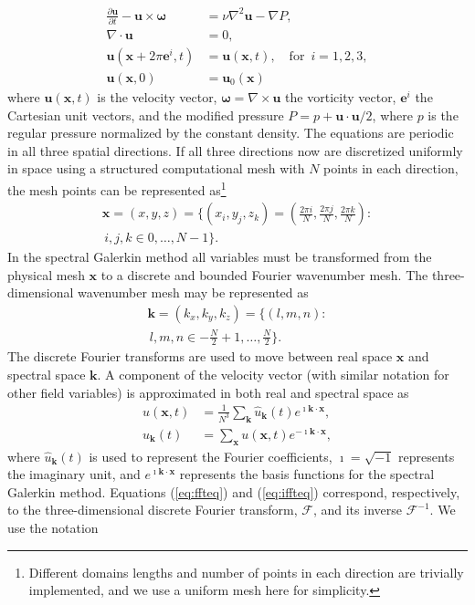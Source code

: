 \documentclass[final,3p,times,twocolumn]{elsarticle}
\newcounter{bla}
\begin{document}
\begin{align}
 \frac{\partial \bm{u}}{\partial t} - \bm{u} \times \bm{\omega}   &= \nu \nabla^2 \bm{u} - \nabla{P}, \label{eq:NS} \\
 \nabla \cdot \bm{u} &= 0, \\
 \bm{u}(\bm{x}+2\pi \bm{e}^i, t) &= \bm{u}(\bm{x}, t), \quad \text{for }\, i=1,2,3,\\
 \bm{u}(\bm{x}, 0) &= \bm{u}_0(\bm{x})
\end{align}
where $\bm{u}(\bm{x}, t)$ is the velocity vector, $\bm{\omega}=\nabla \times \bm{u}$ the vorticity vector, $\bm{e}^i$ the Cartesian unit vectors, and the modified pressure $P=p+\bm{u}\cdot \bm{u}/2$, where $p$ is the regular pressure normalized by the constant density. The equations are periodic in all three spatial directions. If all three directions now are discretized uniformly in space using a structured computational mesh with $N$ points in each direction, the mesh points can be represented as\footnote{Different domains lengths and number of points in each direction are trivially implemented, and we use a uniform mesh here for simplicity.}
\begin{multline}
\bm{x} = (x, y, z) = \Big\{(x_i, y_j, z_k) = \left( \frac{2\pi i}{N}, 
\frac{2\pi j}{N}, \frac{2\pi k}{N} \right): \\ 
\, i,j,k \in 0,\ldots, N-1 \Big\}.
\label{eq:realmesh}
\end{multline}
In the spectral Galerkin method all variables must be transformed from the physical mesh $\bm{x}$ to a discrete and bounded Fourier wavenumber mesh. The three-dimensional wavenumber mesh may be represented as
\begin{multline}
\bm{k} = (k_x, k_y, k_z) = \Big\{(l, m, n): \\ \, l, m, n \in 
-\frac{N}{2}+1,\ldots, \frac{N}{2} \Big\}.
\label{eq:kmesh}
\end{multline}
The discrete Fourier transforms are used to move between real space $\bm{x}$ and spectral space $\bm{k}$. A component of the velocity vector (with similar notation for other field variables) is approximated in both real and spectral space as
\begin{align}
u(\bm{x}, t) &= \frac{1}{N^3}\sum_{\bm{k}} \hat{u}_{\bm{k}}(t) e^{\imath \bm{k}\cdot \bm{x}}, \label{eq:ffteq} \\
\hat{u}_{\bm{k}}(t) &= \sum_{\bm{x}} u(\bm{x}, t) e^{-\imath \bm{k}\cdot \bm{x}},\label{eq:iffteq}
\end{align}
where $\hat{u}_{\bm{k}}(t)$ is used to represent the Fourier coefficients, $\imath=\sqrt{-1}$ represents the imaginary unit, and $e^{\imath \bm{k}\cdot \bm{x}}$ represents the basis functions for the spectral Galerkin method. Equations (\ref{eq:ffteq}) and (\ref{eq:iffteq}) correspond, respectively, to the three-dimensional discrete Fourier transform, $\mathcal{F}$, and its inverse $\mathcal{F}^{-1}$. We use the notation
\end{document}
